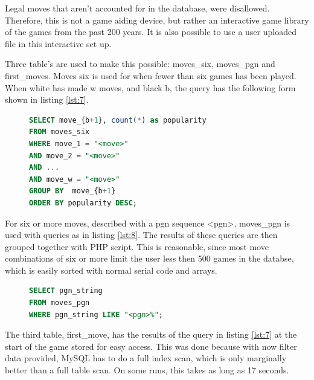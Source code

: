 \documentclass{article}
\begin{document}
Legal moves that aren't accounted for
in the database, were disallowed.  Therefore, this is not a game aiding
device, but rather an interactive game library of the games from the past
200 years.  It is also possible to use a user uploaded file in this
interactive set up. 

Three table's are used to make this possible:  moves\_six, moves\_pgn and
first\_moves. Moves six is used for when fewer than six games has been
played.  When white has made w moves, and black b, the query has the
following form shown in listing \ref{lst:7}.

\begin{figure}[h]
	\begin{lstlisting}[label={lst:7}, language=sql, frame=single,
	caption=Queries on moves\_pgn]
SELECT move_{b+1}, count(*) as popularity
FROM moves_six
WHERE move_1 = "<move>" 
AND move_2 = "<move>" 
AND ... 
AND move_w = "<move>"
GROUP BY  move_{b+1}
ORDER BY popularity DESC;
	\end{lstlisting}
\end{figure}

For six or more moves, described with a pgn sequence <pgn>, 
moves\_pgn is used with queries as in listing \ref{lst:8}.  The results of
these queries are then grouped together with PHP script.  This is
reasonable, since most move combinations of six or more limit the user less
then 500 games in the databse, which is easily sorted with normal serial
code and arrays.  

\begin{figure}[h]
	\begin{lstlisting}[label={lst:8}, language=sql, frame=single,
	caption=Queries on moves\_pgn]
SELECT pgn_string
FROM moves_pgn
WHERE pgn_string LIKE "<pgn>%";
	\end{lstlisting}
\end{figure}

The third table, first\_move, has the results of the query in 
listing \ref{lst:7} at the start of the game stored for easy access.
This was done because with now filter data provided, MySQL has to do a full
index scan, which is only marginally better than a full table scan.  On
some runs, this takes as long as 17 seconds.

\newpage


\end{document}

